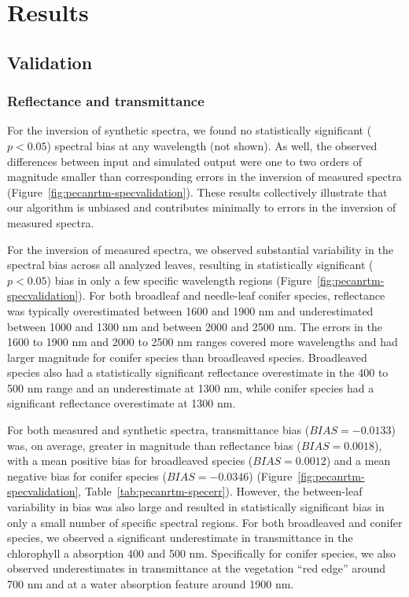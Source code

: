 \section{Results}\label{sec:pecanrtm-results}

\subsection{Validation}

\subsubsection{Reflectance and transmittance}

For the inversion of synthetic spectra, we found no statistically significant ($p < 0.05$) spectral bias at any wavelength (not shown).%
As well, the observed differences between input and simulated output were one to two orders of magnitude smaller than corresponding errors in the inversion of measured spectra (Figure~\ref{fig:pecanrtm-specvalidation}).%
These results collectively illustrate that our algorithm is unbiased and contributes minimally to errors in the inversion of measured spectra.

For the inversion of measured spectra, we observed substantial variability in the spectral bias across all analyzed leaves, resulting in statistically significant ($p < 0.05$) bias in only a few specific wavelength regions (Figure~\ref{fig:pecanrtm-specvalidation}). %
For both broadleaf and needle-leaf conifer species, reflectance was typically overestimated between 1600 and 1900 nm and underestimated between 1000 and 1300 nm and between 2000 and 2500 nm.
The errors in the 1600 to 1900 nm and 2000 to 2500 nm ranges covered more wavelengths and had larger magnitude for conifer species than broadleaved species.
Broadleaved species also had a statistically significant reflectance overestimate in the 400 to 500 nm range and an underestimate at 1300 nm, while conifer species had a significant reflectance overestimate at 1300 nm.

For both measured and synthetic spectra, transmittance bias ($BIAS = -0.0133$) was, on average, greater in magnitude than reflectance bias ($BIAS = 0.0018$), with a mean positive bias for broadleaved species ($BIAS = 0.0012$) and a mean negative bias for conifer species ($BIAS = -0.0346$) (Figure~\ref{fig:pecanrtm-specvalidation}, Table~\ref{tab:pecanrtm-specerr}).
However, the between-leaf variability in bias was also large and resulted in statistically significant bias in only a small number of specific spectral regions.
For both broadleaved and conifer species, we observed a significant underestimate in transmittance in the chlorophyll a absorption 400 and 500 nm.
Specifically for conifer species, we also observed underestimates in transmittance at the vegetation ``red edge'' around 700 nm and at a water absorption feature around 1900 nm.


